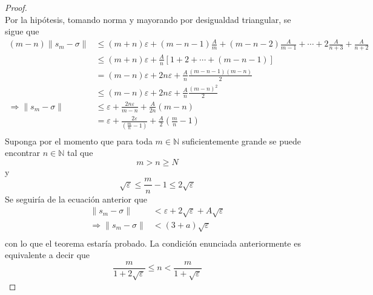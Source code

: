 \documentclass[12pt]{report}
\newcounter{it}
\theoremstyle{largebreak}
\renewcommand{\leq}{\ensuremath{\leqslant}}
\renewcommand{\geq}{\ensuremath{\geqslant}}
\newcommand\norm[1]{\ensuremath{\|#1\|}}
\begin{document}
\begin{proof}
\begin{equation*}
        \end{equation*}
        Por la hipótesis, tomando norma y mayorando por desigualdad triangular, se sigue que
        \begin{equation*}
            \begin{split}
                (m-n)\norm{s_m-\sigma}&\leq (m+n)\varepsilon+(m-n-1)\frac{A}{m}+(m-n-2)\frac{A}{m-1}+\cdots+2\frac{A}{n+3}+\frac{A}{n+2}\\
                &\leq (m+n)\varepsilon+\frac{A}{n}\left[1+2+\cdots+(m-n-1) \right]\\
                &=(m-n)\varepsilon+2n\varepsilon+\frac{A}{n}\frac{(m-n-1)(m-n)}{2}\\
                &\leq(m-n)\varepsilon+2n\varepsilon+\frac{A}{n}\frac{(m-n)^2}{2}\\
                \Rightarrow \norm{s_m-\sigma}&\leq\varepsilon+\frac{2n\varepsilon}{m-n}+\frac{A}{2n}(m-n)\\
                &=\varepsilon+\frac{2\varepsilon}{\left(\frac{m}{n}-1\right)}+\frac{A}{2}\left(\frac{m}{n}-1\right)\\
            \end{split}
        \end{equation*}
        Suponga por el momento que para toda $m\in\mathbb{N}$ suficientemente grande se puede encontrar $n\in\mathbb{N}$ tal que
        \begin{equation*}
            m>n\geq N
        \end{equation*}
        y
        \begin{equation*}
            \sqrt{\varepsilon}\leq\frac{m}{n}-1\leq2\sqrt{\varepsilon}
        \end{equation*}
        Se seguiría de la ecuación anterior que
        \begin{equation*}
            \begin{split}
                \norm{s_m-\sigma}&<\varepsilon+2\sqrt{\varepsilon}+A\sqrt{\varepsilon}\\
                \Rightarrow \norm{s_m-\sigma}&<(3+a)\sqrt{\varepsilon}\\
            \end{split}
        \end{equation*}
        con lo que el teorema estaría probado. La condición enunciada anteriormente es equivalente a decir que
        \begin{equation*}
            \frac{m}{1+2\sqrt{\varepsilon}}\leq n<\frac{m}{1+\sqrt{\varepsilon}}
        \end{equation*}

\end{proof}
\end{document}
